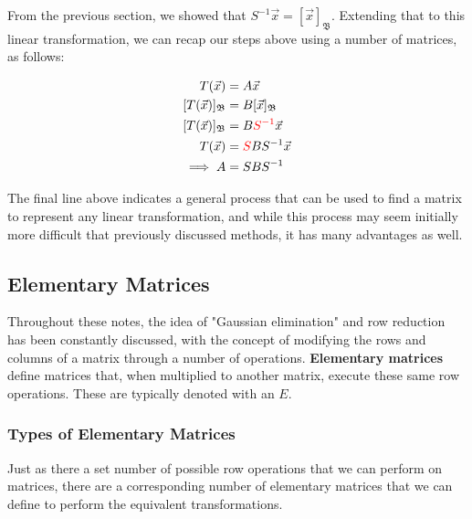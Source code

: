 \documentclass[12pt]{article}
\begin{document}
    From the previous section, we showed that $S^{-1}\vec{x} = [\vec{x}]_{\mathfrak{B}}$. Extending that to this linear transformation, we can recap our steps above using a number of matrices, as follows:

    \begin{equation}
        \begin{split}
            T(\vec{x}) &= A\vec{x}\\
            [T(\vec{x})]_{\mathfrak{B}} &= B[\vec{x}]_{\mathfrak{B}}\\
            [T(\vec{x})]_{\mathfrak{B}} &= B\textcolor{red}{S^{-1}}\vec{x}\\
            T(\vec{x})&= \textcolor{red}{S}BS^{-1}\vec{x}\\
            \implies A &= SBS^{-1}\\
        \end{split}
    \end{equation}

The final line above indicates a general process that can be used to find a matrix to represent any linear transformation, and while this process may seem initially more difficult that previously discussed methods, it has many advantages as well.

\subsection{Elementary Matrices}

Throughout these notes, the idea of "Gaussian elimination" and row reduction has been constantly discussed, with the concept of modifying the rows and columns of a matrix through a number of operations. \textbf{Elementary matrices} define matrices that, when multiplied to another matrix, execute these same row operations. These are typically denoted with an $E$.


\subsubsection{Types of Elementary Matrices}

Just as there a set number of possible row operations that we can perform on matrices, there are a corresponding number of elementary matrices that we can define to perform the equivalent transformations.
\end{document}
